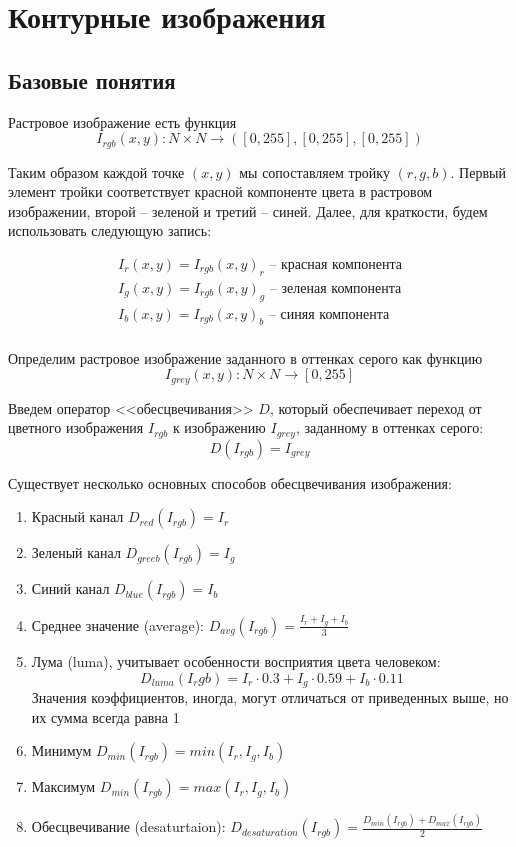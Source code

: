 \chapter{Контурные изображения}
\section{Базовые понятия}
\begin{definition}
Растровое изображение есть функция $$I_{rgb}(x,y): N \times N \to([0,255],[0,255],[0,255])$$ 
\end{definition}
Таким образом каждой точке $(x,y)$ мы сопоставляем тройку $(r,g,b)$. Первый элемент тройки соответствует красной компоненте цвета в растровом изображении, второй -- зеленой и третий -- синей. Далее, для краткости, будем использовать следующую запись:

$$
\begin{array}{l}
I_r(x,y) = I_{rgb}(x,y)_r \text{ -- красная компонента}\\
I_g(x,y) = I_{rgb}(x,y)_g \text{ -- зеленая компонента}\\
I_b(x,y) = I_{rgb}(x,y)_b \text{ -- синяя компонента}\\
\end{array}
$$

\begin{definition}
Определим растровое изображение заданного в оттенках серого как функцию
$$I_{grey}(x,y): N \times N \to[0,255]$$
\end{definition}

\begin{definition}
Введем оператор <<обесцвечивания>> $D$, который обеспечивает переход от цветного изображения $I_{rgb}$ к изображению $I_{grey}$, заданному в оттенках серого:
$$D(I_{rgb}) = I_{grey}$$
\end{definition}

Существует несколько основных способов обесцвечивания изображения:
\begin{enumerate}
 \item Красный канал $D_{red}(I_{rgb}) = I_r$
 \item Зеленый канал $D_{greeb}(I_{rgb}) = I_g$
 \item Синий канал $D_{blue}(I_{rgb}) = I_b$  
 \item Среднее значение (average): $D_{avg}(I_{rgb}) = \frac{I_r + I_g + I_b}{3}$
 \item Лума (luma), учитывает особенности восприятия цвета человеком: $$D_{luma}(I_rgb) = I_r\cdot0.3 + I_g\cdot0.59 + I_b\cdot0.11$$
 		Значения коэффициентов, иногда, могут отличаться от приведенных выше, но их сумма всегда равна 1
 \item Минимум  $D_{min}(I_{rgb}) = min(I_r, I_g, I_b)$
 \item Максимум  $D_{min}(I_{rgb}) = max(I_r, I_g, I_b)$
 \item Обесцвечивание (desaturtaion): $D_{desaturation}(I_{rgb}) = \frac{D_{min}(I_{rgb}) + D_{max}(I_{rgb})}{2}$
\end{enumerate}

